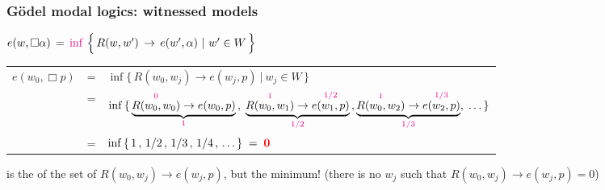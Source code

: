 \begin{frame}
\frametitle{G\"odel modal logics: witnessed models}

\begin{custombox}[top=0mm,bottom=0mm,width=25em]\small
\smallskip\center
  $e(w,\Box \a) \,= \,\tm{\inf}\ \Big\{\,R(w,w')\,\to\, e(w',\a)~|~w'\in W \,\Big\}$
\smallskip
\end{custombox}


 \begin{center}
    
  \end{center}
  
  \begin{tabular}{m{3em}m{0.5em}m{15em}}\small
    $e(w_0,\Box p)$ &= &\small
                           $\inf\{\, R(w_0,w_j)\to  e(w_j,p)~|~w_j\in W \,\}$
    \\[1ex]
                  &= & \medfont $\inf\,\{\,
       \underbrace{\overset{{\color{magenta} 0}}{R(w_0,w_0)}\to  e(w_0,p)}_{{\color{magenta} 1}}\,,\;
        \underbrace{\overset{{\color{magenta} 1}}{R(w_0,w_1)}\to  \overset{{\color{magenta} 1/2}}{e(w_1,p)}}_{{\color{magenta} 1/2}}\,,
          \underbrace{\overset{{\color{magenta} 1}}{R(w_0,w_2)}\to  \overset{{\color{magenta} 1/3}}{e(w_2,p)}}_{{\color{magenta} 1/3}},\;\dots   \,\}$
      \\[2.5ex]
                    &= &\small
                         $\inf\,\{\, 1\,, \, 1/2\,,\, 1/3\,,\, 1/4\,, \, \dots \,\} \;=\; {\bf\color{red}  0}$                    
\end{tabular}
     

\MSK


 is the  of the set of $R(w_0,w_j)\to e(w_j,p)$, but
 the minimum!  (there is no $w_j$ such that $R(w_0,w_j)\to
e(w_j,p) = 0$)
         

\end{frame}








